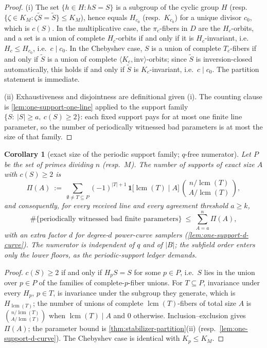 \documentclass[11pt]{article}
\newtheorem{corollary}[corollary]{Corollary}
\theoremstyle{definition}
\theoremstyle{remark}
\newcommand{\B}{B}
\begin{document}
\begin{proof}
(i) The set $\{h\in H:hS=S\}$ is a subgroup of the cyclic group $H$ (resp.\ $\{\zeta\in K_M:\zeta\widetilde S=\widetilde S\}\le K_M$), hence equals $H_{c_0}$ (resp.\ $K_{c_0}$) for a unique divisor $c_0$, which is $c(S)$. In the multiplicative case, the $\pi_c$-fibers in $D$ are the $H_c$-orbits, and a set is a union of complete $H_c$-orbits if and only if it is $H_c$-invariant, i.e.\ $H_c\le H_{c_0}$, i.e.\ $c\mid c_0$. In the Chebyshev case, $S$ is a union of complete $T_c$-fibers if and only if $\widetilde S$ is a union of complete $\langle K_c,\mathrm{inv}\rangle$-orbits; since $\widetilde S$ is inversion-closed automatically, this holds if and only if $\widetilde S$ is $K_c$-invariant, i.e.\ $c\mid c_0$. The partition statement is immediate.

(ii) Exhaustiveness and disjointness are definitional given (i). The counting clause is \cref{lem:one-support-one-line} applied to the support family $\{S:\ |S|\ge a,\ c(S)\ge2\}$: each fixed support pays for at most one finite line parameter, so the number of periodically witnessed bad parameters is at most the size of that family.
\end{proof}

\begin{corollary}[exact size of the periodic support family; $q$-free numerator]\label{cor:periodic-support-count}
Let $P$ be the set of primes dividing $n$ \textup(resp.\ $M$\textup). The number of supports of exact size $A$ with $c(S)\ge2$ is
\[
\Pi(A)\ :=\ \sum_{\emptyset\ne T\subseteq P}(-1)^{|T|+1}\,
\mathbf 1\bigl[\operatorname{lcm}(T)\mid A\bigr]\,
\binom{\,n/\operatorname{lcm}(T)\,}{\,A/\operatorname{lcm}(T)\,},
\]
and consequently, for every received line and every agreement threshold $a\ge k$,
\[
\#\{\text{periodically witnessed bad finite parameters}\}\ \le\ \sum_{A=a}^{n}\Pi(A),
\]
with an extra factor $d$ for degree-$d$ power-curve samplers \textup(\cref{lem:one-support-d-curve}\textup). The numerator is independent of $q$ and of $|\B|$; the subfield order enters only the lower floors, as the periodic-support ledger demands.
\end{corollary}

\begin{proof}
$c(S)\ge2$ if and only if $H_pS=S$ for some $p\in P$, i.e.\ $S$ lies in the union over $p\in P$ of the families of complete-$p$-fiber unions. For $T\subseteq P$, invariance under every $H_p$, $p\in T$, is invariance under the subgroup they generate, which is $H_{\operatorname{lcm}(T)}$; the number of unions of complete $\operatorname{lcm}(T)$-fibers of total size $A$ is $\binom{n/\operatorname{lcm}(T)}{A/\operatorname{lcm}(T)}$ when $\operatorname{lcm}(T)\mid A$ and $0$ otherwise. Inclusion--exclusion gives $\Pi(A)$; the parameter bound is \cref{thm:stabilizer-partition}(ii) \textup(resp.\ \cref{lem:one-support-d-curve}\textup). The Chebyshev case is identical with $K_p\le K_M$.
\end{proof}
\end{document}
